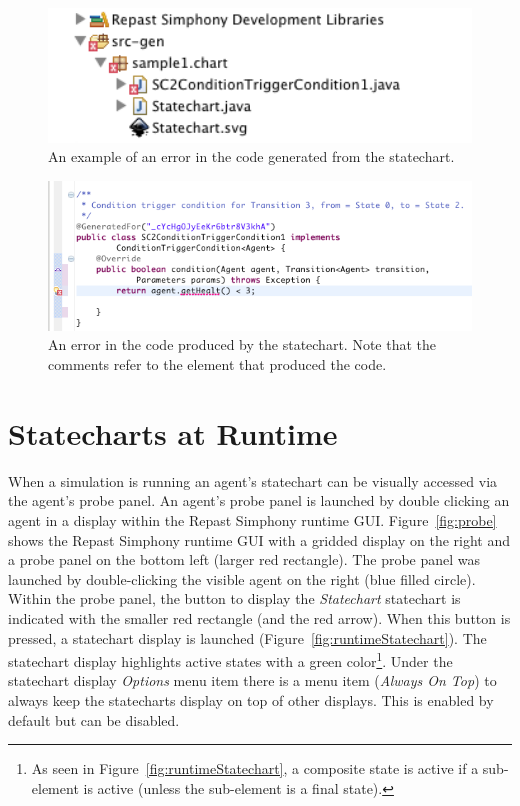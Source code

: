 \documentclass[11pt]{amsart}
\begin{document}
\begin{figure}
\begin{center}
\vspace{.2in}
\centerline {
\includegraphics[width=5in]{StatechartsImages/srcgen_error.png}
}
\caption{An example of an error in the code generated from the statechart.}
\label{fig:srcgen}
\end{center}
\end{figure}

\begin{figure}
\begin{center}
\vspace{.2in}
\centerline {
\includegraphics[width=5.5in]{StatechartsImages/code_error.png}
}
\caption{An error in the code produced by the statechart. Note that the comments refer to the element that produced the code.}
\label{fig:codeerror}
\end{center}
\end{figure}


\section{Statecharts at Runtime}
\label{sec:runtime}
When a simulation is running an agent's statechart can be visually accessed via the agent's probe panel. An agent's probe panel is launched by double clicking an agent in a display within the Repast Simphony runtime GUI. Figure~\ref{fig:probe} shows the Repast Simphony runtime GUI with a gridded display on the right and a probe panel on the bottom left (larger red rectangle). The probe panel was launched by double-clicking the visible agent on the right (blue filled circle). Within the probe panel, the button to display the \emph{Statechart} statechart is indicated with the smaller red rectangle (and the red arrow). When this button is pressed, a statechart display is launched (Figure~\ref{fig:runtimeStatechart}). The statechart display highlights active states with a green color\footnote{As seen in Figure~\ref{fig:runtimeStatechart}, a composite state is active if a sub-element is active (unless the sub-element is a final state).}. Under the statechart display \emph{Options} menu item there is a menu item (\emph{Always On Top}) to always keep the statecharts display on top of other displays. This is enabled by default but can be disabled.
\end{document}
